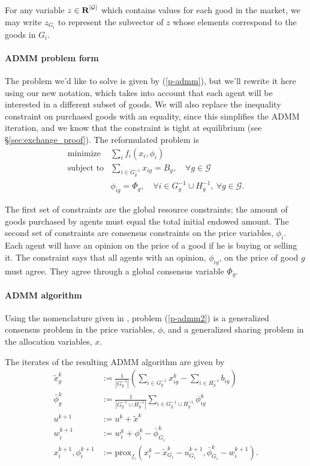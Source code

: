 \documentclass[12pt]{article}
\begin{document}
For any variable $z \in {\mbox{\bf R}}^{|\mathcal{G}|}$ which contains values for
each good in the market, we may write $z_{G_i}$ to represent the subvector
of $z$ whose elements correspond to the goods in $G_i$.

\paragraph{ADMM problem form}

The problem we'd like to solve is given by (\ref{p-admm}), but we'll rewrite it
here using our new notation, which takes into account that each agent will be
interested in a different subset of goods. We will also replace the inequality
constraint on purchased goods with an equality, since this simplifies the ADMM
iteration, and we know that the constraint is tight at equilibrium (see
\S\ref{sec:exchange_proof}).
The reformulated problem is
\begin{equation}
\begin{array}{ll}
\mbox{minimize} & \sum_i f_i(x_i, \phi_i) \\
\mbox{subject to} & \sum\limits_{i \in G^{-1}_g} x_{ig} = B_g,\quad \forall g \in \mathcal{G}\\
& \phi_{ig} = \Phi_g,\quad \forall i \in G^{-1}_g \cup H^{-1}_g,\ \forall g \in \mathcal{G}.
\end{array}
\label{p-admm2}
\end{equation}

The first set of constraints are the global resource constraints; the amount of
goods purchased by agents must equal the total initial endowed amount. The
second set of constraints are consensus constraints on the price variables,
$\phi_i$. Each agent will have an opinion on the price of a good if he is
buying or selling it. The constraint says that all agents with an opinion,
$\phi_{ig}$, on the price of good $g$ must agree. They agree through a global
consensus variable $\Phi_g$.


\paragraph{ADMM algorithm}

Using the nomenclature given in \cite{boyd2011distributed}, problem
(\ref{p-admm2}) is a generalized consensus problem in the price variables,
$\phi$, and a generalized sharing problem in the allocation variables, $x$.

The iterates of the resulting ADMM algorithm are given by
\begin{align}
\label{a-xtild}
\tilde{x}^k_g &:= \frac{1}{|G^{-1}_g|} \left( \sum_{i \in G^{-1}_g} x^k_{ig} - \sum_{i \in H^{-1}_g} b_{ig}\right)\\
\label{a-phibar}
\bar{\phi}^k_g &:= \frac{1}{ |G^{-1}_g \cup H^{-1}_g| } \sum_{i \in G^{-1}_g \cup H^{-1}_g}\phi^k_{ig}\\
u^{k+1} &:= u^k + \tilde{x}^k\\
w_i^{k+1} &:= w_i^k + \phi^k_i - \bar{\phi}^k_{G_i}\\
\label{a-prox}
x_i^{k+1}, \phi_i^{k+1} &:= \mbox{prox}_{f_i}(x_i^k - \tilde{x}^k_{G_i} - u^{k+1}_{G_i},
\bar{\phi}^k_{G_i} - w_i^{k+1}).
\end{align}
\end{document}
